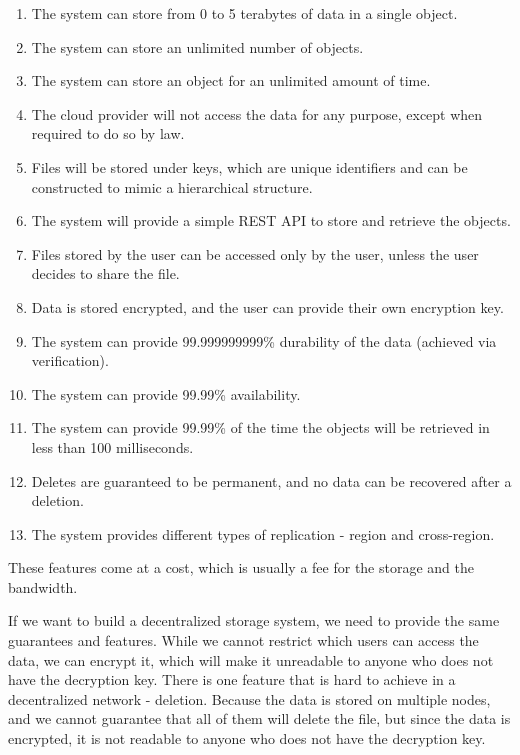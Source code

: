 \begin{enumerate}
    \item The system can store from 0 to 5 terabytes of data in a single object.
    \item The system can store an unlimited number of objects.
    \item The system can store an object for an unlimited amount of time.
    \item The cloud provider will not access the data for any purpose, except when required to do so by law.
    \item Files will be stored under keys, which are unique identifiers and
        can be constructed to mimic a hierarchical structure.
    \item The system will provide a simple REST API to store and retrieve the objects.
    \item Files stored by the user can be accessed only by the user, unless the user decides to share the file.
    \item Data is stored encrypted, and the user can provide their own encryption key.
    \item The system can provide 99.999999999\% durability of the data (achieved via verification).
    \item The system can provide 99.99\% availability.
    \item The system can provide 99.99\% of the time the objects will be retrieved in less than 100 milliseconds.
    \item Deletes are guaranteed to be permanent, and no data can be recovered after a deletion.
    \item The system provides different types of replication - region and cross-region.
\end{enumerate}

These features come at a cost, which is usually a fee for the storage and the bandwidth.

If we want to build a decentralized storage system, we need to provide the same guarantees and features.
While we cannot restrict which users can access the data, we can encrypt it,
which will make it unreadable to anyone who does not have the decryption key.
There is one feature that is hard to achieve in a decentralized network - deletion.
Because the data is stored on multiple nodes, and we cannot guarantee that all of them will delete the file,
but since the data is encrypted, it is not readable to anyone who does not have the decryption key.

